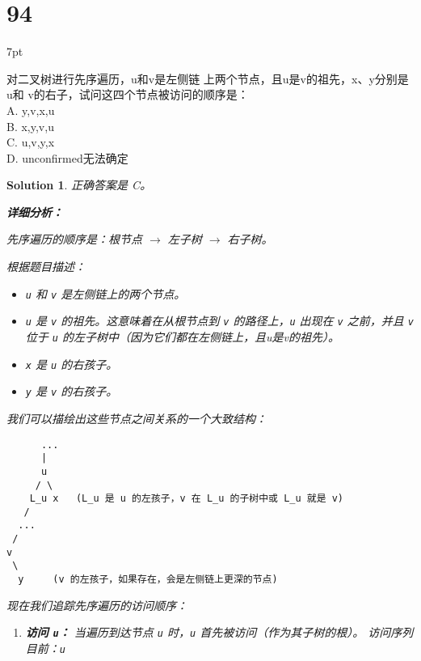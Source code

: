 \documentclass[UTF8]{report}
\newtheorem{solution}{Solution}
\theoremstyle{MyLineTheoremStyle} %
\theoremstyle{MyBlockTheoremStyle} %
\theoremstyle{MySubsubsectionStyle} %
\newenvironment{graybox}{%
        \def\FrameCommand{%
        \hspace{1pt}%
        {\color{gray}\small \vrule width 2pt}%
        {\color{graybox_color}\vrule width 4pt}%
        \colorbox{graybox_color}%
        }%
        \MakeFramed{\advance\hsize-\width\FrameRestore}%
        \noindent\hspace{-4.55pt}%
        \begin{adjustwidth}{}{7pt}%
        \vspace{2pt}\vspace{2pt}%
        }
        {%
        \vspace{2pt}\end{adjustwidth}\endMakeFramed%
        }
\begin{document}
\section*{94}
\begin{graybox}
对二叉树进行先序遍历，u和v是左侧链
上两个节点，且u是v的祖先，x、y分别是u和
v的右子，试问这四个节点被访问的顺序是： \\
A. y,v,x,u \\
B. x,y,v,u \\
C. u,v,y,x \\
D. unconfirmed无法确定
\end{graybox}

\begin{solution}
正确答案是 C。

\textbf{详细分析：}

先序遍历的顺序是：根节点 $\rightarrow$ 左子树 $\rightarrow$ 右子树。

根据题目描述：
\begin{itemize}
    \item \texttt{u} 和 \texttt{v} 是左侧链上的两个节点。
    \item \texttt{u} 是 \texttt{v} 的祖先。这意味着在从根节点到 \texttt{v} 的路径上，\texttt{u} 出现在 \texttt{v} 之前，并且 \texttt{v} 位于 \texttt{u} 的左子树中（因为它们都在左侧链上，且u是v的祖先）。
    \item \texttt{x} 是 \texttt{u} 的右孩子。
    \item \texttt{y} 是 \texttt{v} 的右孩子。
\end{itemize}

我们可以描绘出这些节点之间关系的一个大致结构：
\begin{verbatim}
      ...
      |
      u
     / \
    L_u x   (L_u 是 u 的左孩子，v 在 L_u 的子树中或 L_u 就是 v)
   /
  ...
 /
v
 \
  y     (v 的左孩子，如果存在，会是左侧链上更深的节点)
\end{verbatim}

现在我们追踪先序遍历的访问顺序：
\begin{enumerate}
    \item \textbf{访问 \texttt{u}：}
    当遍历到达节点 \texttt{u} 时，\texttt{u} 首先被访问（作为其子树的根）。
    访问序列目前：\texttt{u}


\end{enumerate}
\end{solution}
\end{document}
